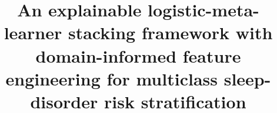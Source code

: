 \documentclass{turkjour}%
\begin{document}
\title{An explainable logistic-meta-learner stacking framework with domain-informed feature engineering for multiclass sleep-disorder risk stratification}
\author{}
\date{}

% 

\maketitle
\end{document}
